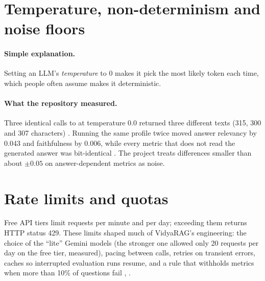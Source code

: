 \section{Temperature, non-determinism and noise floors}

\paragraph{Simple explanation.} Setting an LLM's \emph{temperature} to 0 makes it pick the most likely token each time, which people often assume makes it deterministic.

\paragraph{What the repository measured.} Three identical calls to  at temperature 0.0 returned three different texts (315, 300 and 307 characters) . Running the same profile twice moved answer relevancy by 0.043 and faithfulness by 0.006, while every metric that does not read the generated answer was bit-identical . The project treats differences smaller than about $\pm0.05$ on answer-dependent metrics as noise.

\section{Rate limits and quotas}

Free API tiers limit requests per minute and per day; exceeding them returns HTTP status 429. These limits shaped much of VidyaRAG's engineering: the choice of the ``lite'' Gemini models (the stronger one allowed only 20 requests per day on the free tier, measured), pacing between calls, retries on transient errors, caches so interrupted evaluation runs resume, and a rule that withholds metrics when more than 10\% of questions fail , .
